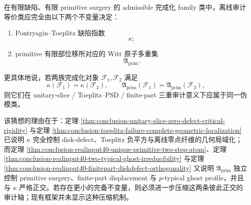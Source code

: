\begin{conjecture}\label{conj:conclusion-unitary-slice-pseudomoduli-two-invariants}
在有限缺陷、有限 primitive surgery 的 admissible 完成化 family 类中，离线审计等价类应完全由以下两个不变量决定：
\begin{enumerate}
  \item Pontryagin--Toeplitz 缺陷指数
  \[
  \kappa;
  \]
  \item primitive 有限部位移所对应的 Witt 原子多重集
  \[
  \mathfrak A_{\mathrm{prim}}.
  \]
\end{enumerate}
更具体地说，若两族完成化对象 \(\mathcal F_1,\mathcal F_2\) 满足
\[
\kappa(\mathcal F_1)=\kappa(\mathcal F_2),
\qquad
\mathfrak A_{\mathrm{prim}}(\mathcal F_1)=\mathfrak A_{\mathrm{prim}}(\mathcal F_2),
\]
则它们在 unitary-slice / Toeplitz--PSD / finite-part 三重审计意义下应属于同一伪模类。

该猜想的理由在于：定理 \ref{thm:conclusion-unitary-slice-zero-defect-critical-rigidity} 与定理 \ref{thm:conclusion-toeplitz-failure-complete-geometric-localization} 已说明 \(\kappa\) 完全控制 disk-defect、Toeplitz 负平方与离线零点纤维的几何局域化；而定理 \ref{thm:conclusion-realinput40-unique-primitive-two-step-atom}、定理 \ref{thm:conclusion-realinput40-two-typical-ghost-irreducibility} 与定理 \ref{thm:conclusion-realinput40-finitepart-diskdefect-orthogonality} 又说明 \(\mathfrak A_{\mathrm{prim}}\) 独立控制 primitive surgery、finite-part displacement 与 \(p\)-typical ghost profile，并且与 \(\kappa\) 严格正交。若存在更小的完备不变量，则必须进一步压缩这两条彼此正交的审计轴；现有框架并未显示这种压缩机制。
\end{conjecture}
